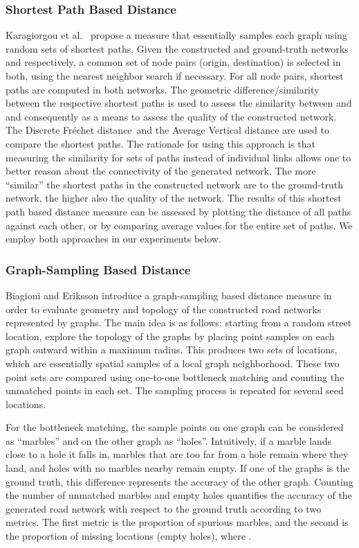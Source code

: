 \documentclass[natbib]{svjour3}                    \smartqed  \usepackage[table]{xcolor}
\newcommand{\Frd}{Fr\'echet distance}
\begin{document}
\subsubsection{Shortest Path Based Distance \protect\cite{Karagiorgou:2012:VTD:2424321.2424334}}
Karagiorgou et al.~\cite{Karagiorgou:2012:VTD:2424321.2424334} propose a measure that essentially samples each graph using random sets of shortest paths.
Given the constructed and ground-truth networks  and  respectively, a common set of node pairs (origin, destination) is selected in both, using the nearest neighbor search if necessary. For all node pairs, shortest paths are computed in both networks. The geometric difference/similarity between the respective shortest paths is used to assess the similarity between  and  and consequently as a means to assess the quality of the constructed network.
The Discrete \Frd\ and the Average Vertical distance are used to compare the shortest paths.
The rationale for using this approach is that measuring the similarity for sets of paths instead of individual links allows one to better reason about the connectivity of the generated network. The more ``similar'' the shortest paths in the constructed network are to the ground-truth network, the higher also the quality of the network.
The results of this shortest path based distance measure can be assessed by plotting the distance of all paths against each other, or by comparing average values for the entire set of paths. We employ both approaches in our experiments below.

\subsubsection{Graph-Sampling Based Distance \protect\cite{be-irmgp-12}}
Biagioni and Eriksson \cite{be-irmgp-12} introduce a graph-sampling based distance measure in order to evaluate geometry and topology of the constructed road networks represented by graphs. The main idea is as follows: starting from a random street location, explore the topology of the graphs by placing point samples on each graph outward within a maximum radius. This produces two sets of locations, which are essentially spatial samples of a local graph neighborhood. These two point sets are compared using one-to-one bottleneck matching and counting the unmatched points in each set. The sampling process is repeated for several seed locations.


For the bottleneck matching, the sample points on one graph can be considered as ``marbles'' and on the other graph as ``holes''. Intuitively, if a marble lands close to a hole it falls in, marbles that are too far from a hole remain where they land, and holes with no marbles nearby remain empty. If one of the graphs is the ground truth, this difference represents the accuracy of the other graph. Counting the number of unmatched marbles and empty holes quantifies the accuracy of the generated road network with respect to the ground truth according to two metrics. The first metric is the proportion of spurious marbles,  and the second is the proportion of missing locations (empty holes), where  .
\end{document}
